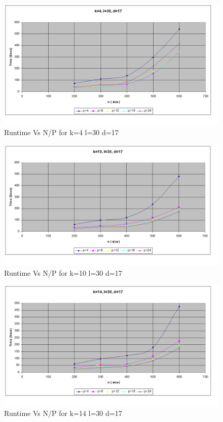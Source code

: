 \documentclass[twoside,11pt]{article}\usepackage{amsmath,amsfonts,amsthm,fullpage}
\begin{document}
\begin{figure}[!htbp]
\centering
\includegraphics[scale=.46]{images/kld_k=4-l=30-d=17} 
\caption{Runtime Vs N/P for k=4 l=30 d=17}
\label{N Vs P for k=4 l=30 d=17}
\end{figure}

\begin{figure}[!htbp]
\centering
\includegraphics[scale=.46]{images/kld_k=10-l=30-d=17} 
\caption{Runtime Vs N/P for k=10 l=30 d=17}
\label{N Vs P for k=10 l=30 d=17}
\end{figure}


\begin{figure}[!htbp]
\centering
\includegraphics[scale=.46]{images/kld_k=14-l=30-d=17} 
\caption{Runtime Vs N/P for k=14 l=30 d=17}
\label{N Vs P for k=14 l=30 d=17}
\end{figure}
\end{document}
